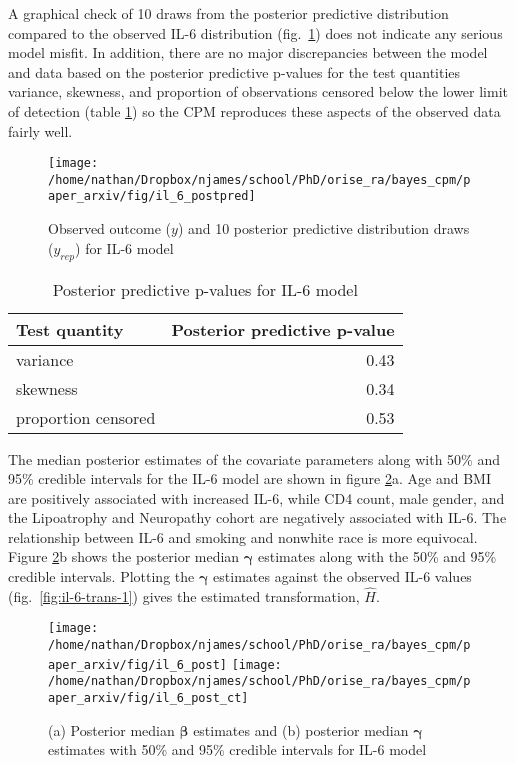 \documentclass[
]{article}
\begin{document}
A graphical check of 10 draws from the posterior predictive distribution compared to the observed IL-6 distribution (fig.~\ref{fig:il6-postpred}) does not indicate any serious model misfit. In addition, there are no major discrepancies between the model and data based on the posterior predictive p-values for the test quantities variance, skewness, and proportion of observations censored below the lower limit of detection (table \ref{tab:ppptab1}) so the CPM reproduces these aspects of the observed data fairly well.

\begin{figure}

{\centering \texttt{[image: /home/nathan/Dropbox/njames/school/PhD/orise\_ra/bayes\_cpm/paper\_arxiv/fig/il\_6\_postpred]} 

}

\caption{Observed outcome ($y$) and 10 posterior predictive distribution draws ($y_{rep}$) for IL-6 model}\label{fig:il6-postpred}
\end{figure}

\begin{table}[!h]

\caption{\label{tab:ppptab1}Posterior predictive p-values for IL-6 model}
\centering
\begin{tabular}[t]{lr}
\toprule
Test quantity & Posterior predictive p-value\\
\midrule
variance & 0.43\\
skewness & 0.34\\
proportion censored & 0.53\\
\bottomrule
\end{tabular}
\end{table}

The median posterior estimates of the covariate parameters along with 50\% and 95\% credible intervals for the IL-6 model are shown in figure \ref{fig:il6-par00}a. Age and BMI are positively associated with increased IL-6, while CD4 count, male gender, and the Lipoatrophy and Neuropathy cohort are negatively associated with IL-6. The relationship between IL-6 and smoking and nonwhite race is more equivocal. Figure \ref{fig:il6-par00}b shows the posterior median \(\boldsymbol{\gamma}\) estimates along with the 50\% and 95\% credible intervals. Plotting the \(\boldsymbol{\gamma}\) estimates against the observed IL-6 values (fig.~\ref{fig:il-6-trans-1}) gives the estimated transformation, \(\hat{H}\).

\begin{figure}

{\centering \texttt{[image: /home/nathan/Dropbox/njames/school/PhD/orise\_ra/bayes\_cpm/paper\_arxiv/fig/il\_6\_post]} \texttt{[image: /home/nathan/Dropbox/njames/school/PhD/orise\_ra/bayes\_cpm/paper\_arxiv/fig/il\_6\_post\_ct]} 

}

\caption{(a) Posterior median $\boldsymbol{\beta}$ estimates and (b) posterior median $\boldsymbol{\gamma}$ estimates with 50\% and 95\% credible intervals for IL-6 model}\label{fig:il6-par00}
\end{figure}
\end{document}
